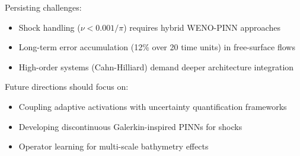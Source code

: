 Persisting challenges:
\begin{itemize}
    \item Shock handling (\(\nu < 0.001/\pi\)) requires hybrid WENO-PINN approaches
    \item Long-term error accumulation (12\% over 20 time units) in free-surface flows
    \item High-order systems (Cahn-Hilliard) demand deeper architecture integration
\end{itemize}

Future directions should focus on:
\begin{itemize}
    \item Coupling adaptive activations with uncertainty quantification frameworks
    \item Developing discontinuous Galerkin-inspired PINNs for shocks
    \item Operator learning for multi-scale bathymetry effects
\end{itemize}
